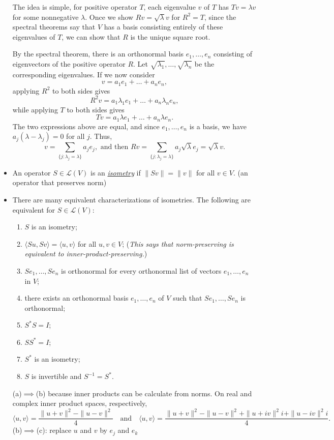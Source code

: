 \documentclass[11pt]{article}
\newcommand{\df}[1]{\ul{\textit{\textsf{#1}}}}
\newcommand{\inp}[2]{\langle #1, #2 \rangle}
\newcommand{\nm}[1]{\|#1\|}
\newcommand{\LV}{\mathcal{L}(V)}
\begin{document}
\begin{itemize}
    The idea is simple, for positive operator $T$, each eigenvalue $v$ of $T$ has $Tv = \lambda v$ for some nonnegative $\lambda$. Once we show $Rv = \sqrt{\lambda}v$ for $R^2=T$, since the spectral theorems say that $V$ has a basis consisting entirely of these eigenvalues of $T$, we can show that $R$ is the unique square root.
    
    By the spectral theorem, there is an orthonormal basis $e_1,\dots,e_n$ consisting of eigenvectors of the positive operator $R$. Let $\sqrt{\lambda_1},\dots,\sqrt{\lambda_n}$ be the corresponding eigenvalues. If we now consider 
    $$v = a_1 e_1+\dots+a_ne_n,$$ applying $R^2$ to both sides gives $$R^2v = a_1 \lambda_1 e_1 + \dots + a_n \lambda_n e_n,$$ while applying $T$ to both sides gives 
    $$Tv = a_1 \lambda e_1 +\dots+ a_n \lambda e_n.$$ The two expressions above are equal, and since $e_1,\dots,e_n$ is a basis, we have $a_j(\lambda - \lambda_j) = 0$ for all $j$. Thus, 
    $$v = \sum_{\{j: \lambda_j=\lambda\}}a_j e_j, \text{ and then } Rv = \sum_{\{j: \lambda_j=\lambda\}} a_j \sqrt{\lambda} e_j = \sqrt{\lambda}v.$$
    
    \item An operator $S \in \LV$ is an \df{isometry} if $\nm{Sv}=\nm{v}$ for all $v \in V$. (an operator that preserves norm)
    \item There are many equivalent characterizations of isometries. The following are equivalent for $S \in \LV$:
    \begin{enumerate}[label=(\alph*)]
    \item $S$ is an isometry;
    \item $\inp{Su}{Sv} = \inp{u}{v}$ for all $u,v \in V$; (\emph{This says that norm-preserving is equivalent to inner-product-preserving.})
    \item $Se_1,\dots,Se_n$ is orthonormal for every orthonormal list of vectors $e_1,\dots,e_n$ in $V$;
    \item there exists an orthonormal basis $e_1,\dots,e_n$ of $V$ such that $Se_1,\dots,Se_n$ is orthonormal;
    \item $S^*S = I$;
    \item $SS^* = I$;
    \item $S^*$ is an isometry;
    \item $S$ is invertible and $S^{-1} = S^*$.
    \end{enumerate}
    
    (a)$\implies$(b) because inner products can be calculate from norms. On real and complex inner product spaces, respectively,
    \begin{equation*}
        \inp{u}{v} = \frac{\nm{u+v}^2-\nm{u-v}^2}{4} \quad \text{and} \quad \inp{u}{v} = \frac{\nm{u+v}^2-\nm{u-v}^2+\nm{u+iv}^2i+\nm{u-iv}^2i}{4}.
    \end{equation*}
    (b)$\implies$(c): replace $u$ and $v$ by $e_j$ and $e_k$
    

\end{itemize}
\end{document}

